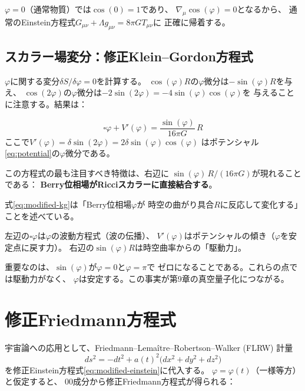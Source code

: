 \noindent
$\varphi = 0$（通常物質）では$\cos(0)=1$であり、
$\nabla_\mu\cos(\varphi) = 0$となるから、
通常のEinstein方程式$G_{\mu\nu} + \Lambda g_{\mu\nu} = 8\pi G T_{\mu\nu}$に
正確に帰着する。

\subsection{スカラー場変分：修正Klein--Gordon方程式}

$\varphi$に関する変分$\delta S / \delta\varphi = 0$を計算する。
$\cos(\varphi)R$の$\varphi$微分は$-\sin(\varphi)R$を与え、
$\cos(2\varphi)$の$\varphi$微分は$-2\sin(2\varphi) = -4\sin(\varphi)\cos(\varphi)$を
与えることに注意する。結果は：

\begin{keyresult}
\begin{equation}
\boxed{
\square\varphi + V'(\varphi)
= \frac{\sin(\varphi)}{16\pi G}\,R
}
\label{eq:modified-kg}
\end{equation}
ここで$V'(\varphi) = \delta\sin(2\varphi) = 2\delta\sin(\varphi)\cos(\varphi)$
はポテンシャル\eqref{eq:potential}の$\varphi$微分である。
\end{keyresult}

\noindent
この方程式の最も注目すべき特徴は、右辺に
$\sin(\varphi)\,R / (16\pi G)$が現れることである：
\textbf{Berry位相場がRicciスカラーに直接結合する}。

\begin{hsbox}
式\eqref{eq:modified-kg}は「Berry位相場$\varphi$が
時空の曲がり具合$R$に反応して変化する」ことを述べている。

左辺の$\square\varphi$は$\varphi$の波動方程式（波の伝播）、
$V'(\varphi)$はポテンシャルの傾き（$\varphi$を安定点に戻す力）。
右辺の$\sin(\varphi)R$は時空曲率からの「駆動力」。

重要なのは、$\sin(\varphi)$が$\varphi=0$と$\varphi=\pi$で
ゼロになることである。これらの点では駆動力がなく、
$\varphi$は安定する。この事実が第9章の真空量子化につながる。
\end{hsbox}


\section{修正Friedmann方程式}
\label{sec:8.3}

宇宙論への応用として、Friedmann--Lema\^itre--Robertson--Walker (FLRW)
計量
\[
ds^2 = -dt^2 + a(t)^2\bigl(dx^2 + dy^2 + dz^2\bigr)
\]
を修正Einstein方程式\eqref{eq:modified-einstein}に代入する。
$\varphi = \varphi(t)$（一様等方）と仮定すると、
$00$成分から修正Friedmann方程式が得られる：

